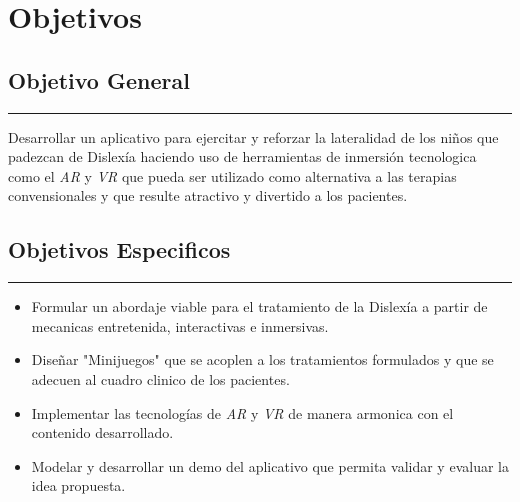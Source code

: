 \documentclass[12pt,letterpaper]{article}
\begin{document}
\section{Objetivos}
\subsection{Objetivo General}
\rule{150mm}{0.1mm} 
Desarrollar un aplicativo para ejercitar y reforzar la lateralidad de los niños que padezcan de Dislexía haciendo uso de herramientas de inmersión tecnologica como el \textit{AR} y \textit{VR} que pueda ser utilizado como alternativa a las terapias convensionales y que resulte atractivo y divertido a los pacientes.\\

\subsection{Objetivos Especificos}
\rule{150mm}{0.1mm} 
\begin{itemize}
\item Formular un abordaje viable para el tratamiento de la Dislexía a partir de mecanicas entretenida, interactivas e inmersivas.
\item Diseñar "Minijuegos" que se acoplen a los tratamientos formulados  y que se adecuen al cuadro clinico de los pacientes.
\item Implementar las tecnologías de \textit{AR} y  \textit{VR} de manera armonica con el contenido desarrollado.
\item Modelar y desarrollar un demo del aplicativo que permita validar y evaluar la idea propuesta.
\end{itemize}
\end{document}
